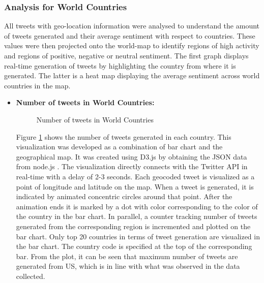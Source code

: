 \documentclass[9pt,twocolumn,twoside]{../../styles/osajnl}
\begin{document}
\subsubsection{Analysis for World Countries}
All tweets with geo-location information were analysed to understand the amount of tweets generated and their average sentiment with respect to countries. These values were then projected onto the world-map to identify regions of high activity and regions of positive, negative or neutral sentiment. The first graph displays real-time generation of tweets by highlighting the country from where it is generated. The latter is a heat map displaying the average sentiment across world countries in the map.
\begin{itemize}
    \item \textbf{Number of tweets in World Countries:}\\
    \begin{figure}[htbp]
    \centering
    \caption{Number of tweets in World Countries}
    \label{fig:worldno}
    \end{figure}
    Figure \ref{fig:worldno} shows the number of tweets generated in each country. This visualization was developed as a combination of bar chart and the geographical map. It was created using D3.js by obtaining the JSON data from node.js \cite{www-d3}. The visualization directly connects with the Twitter API in real-time with a delay of 2-3 seconds. Each geocoded tweet is visualized as a point of longitude and latitude on the map. When a tweet is generated, it is indicated by animated concentric circles around that point. After the animation ends it is marked by a dot with color corresponding to the color of the country in the bar chart. In parallel, a counter tracking number of tweets generated from the corresponding region is incremented and plotted on the bar chart. Only top 20 countries in terms of tweet generation are visualized in the bar chart. The country code is specified at the top of the corresponding bar. From the plot, it can be seen that maximum number of tweets are generated from US, which is in line with what was observed in the data collected.
\end{itemize}
\end{document}

